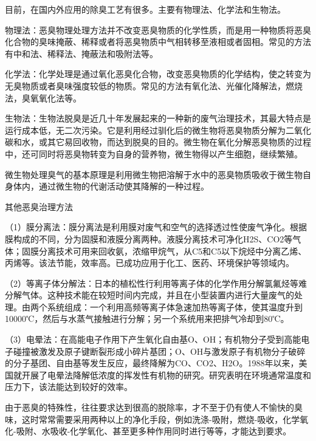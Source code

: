 \par
目前，在国内外应用的除臭工艺有很多。主要有物理法、化学法和生物法。\par
物理法：恶臭物理处理方法并不改变恶臭物质的化学性质，而是用一种物质将恶臭化合物的臭味掩蔽、稀释或者将恶臭物质中气相转移至液相或者固相。常见的方法有中和法、稀释法、掩蔽法和吸附法等。\par
化学法：化学处理是通过氧化恶臭化合物，改变恶臭物质的化学结构，使之转变为无臭物质或者臭味强度较低的物质。常见的方法有氧化法、光催化降解法，燃烧法，臭氧氧化法等。\par
生物法：生物法脱臭是近几十年发展起来的一种新的废气治理技术，其最大特点是运行成本低，无二次污染。它是利用经过驯化后的微生物将恶臭物质分解为二氧化碳和水，或其它易回收物，而达到脱臭的目的。微生物在氧化分解恶臭物质的过程中，还可同时将恶臭物转变为自身的营养物，微生物得以产生细胞，继续繁殖。\par
微生物处理臭气的基本原理是利用微生物把溶解于水中的恶臭物质吸收于微生物自身体内，通过微生物的代谢活动使其降解的一种过程。\par
其他恶臭治理方法\par
（1）膜分离法：膜分离法是利用膜对废气和空气的选择透过性使废气净化。根据膜构成的不同，分为固膜和液膜分离两种。液膜分离技术可净化H2S、CO2等气体；固膜分离技术可用来回收氨，浓缩甲烷气，从C5和C5以下烷烃中分离乙烯、丙烯等。该法节能，效率高。已成功应用于化工、医药、环境保护等领域内。\par
（2）等离子体分解法：日本的植松性行利用等离子体的化学作用分解氯氟烃等难分解气体。这种技术能在较短时间内完成，并且在小型装置内进行大量废气的处理。由两个系统组成：一个利用高频等离子体急速加热等离子体，使其温度升到10000℃，然后与水蒸气接触进行分解；另一个系统用来把排气冷却到80℃。\par
（3）电晕法：在高能电子作用下产生氧化自由基O、OH；有机物分子受到高能电子碰撞被激发及原子键断裂形成小碎片基团；O、OH与激发原子有机物分子破碎的分子基团、自由基等发生反应，最终降解为CO、CO2、H2O。1988年以来，美国就开展了电晕法降解低浓度的挥发性有机物的研究。研究表明在环境通常温度和压力下，该法能达到较好的效率。\par
由于恶臭的特殊性，往往要求达到很高的脱除率，才不至于仍有使人不愉快的臭味，这时常常需要采用两种以上的净化手段，例如洗涤-吸附，燃烧-吸收，化学氧化-吸附、水吸收-化学氧化、甚至更多种作用同时进行等等，才能达到要求。\par
\par
